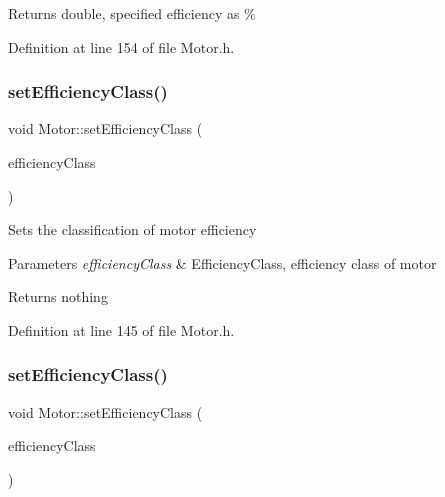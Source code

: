 \begin{DoxyReturn}{Returns}
double, specified efficiency as \% 
\end{DoxyReturn}


Definition at line 154 of file Motor.\+h.

\mbox{\label{class_motor_afa82df266d74ccfed49bf592b5b6526f}} 
\subsubsection{\texorpdfstring{set\+Efficiency\+Class()}{setEfficiencyClass()}\hspace{0.1cm}{\footnotesize\ttfamily [1/3]}}
{\footnotesize\ttfamily void Motor\+::set\+Efficiency\+Class (\begin{DoxyParamCaption}\item[{\hyperlink{class_motor_afa022971ae062406a9f588c601673d4e}{Efficiency\+Class}}]{efficiency\+Class }\end{DoxyParamCaption})\hspace{0.3cm}{\ttfamily [inline]}}

Sets the classification of motor efficiency


\begin{DoxyParams}{Parameters}
{\em efficiency\+Class} & Efficiency\+Class, efficiency class of motor\\
\hline
\end{DoxyParams}
\begin{DoxyReturn}{Returns}
nothing 
\end{DoxyReturn}


Definition at line 145 of file Motor.\+h.

\mbox{\label{class_motor_afa82df266d74ccfed49bf592b5b6526f}} 
\subsubsection{\texorpdfstring{set\+Efficiency\+Class()}{setEfficiencyClass()}\hspace{0.1cm}{\footnotesize\ttfamily [2/3]}}
{\footnotesize\ttfamily void Motor\+::set\+Efficiency\+Class (\begin{DoxyParamCaption}\item[{\hyperlink{class_motor_afa022971ae062406a9f588c601673d4e}{Efficiency\+Class}}]{efficiency\+Class }\end{DoxyParamCaption})\hspace{0.3cm}{\ttfamily [inline]}}

